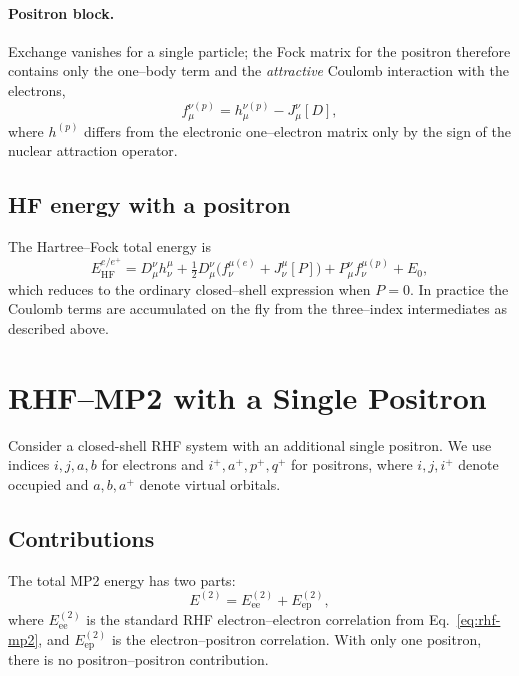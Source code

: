 \documentclass[a4paper,12pt,oneside]{book}
\newcommand{\pos}[1]{{#1}^{+}}
\begin{document}
\paragraph{Positron block.}  Exchange vanishes for a single particle;
the Fock matrix for the positron therefore contains only the one--body
term and the \emph{attractive} Coulomb interaction with the electrons,
\begin{equation}
f_{\mu}^{\nu(p)} = h_{\mu}^{\nu(p)} - J_{\mu}^{\nu}[D],
\label{eq:poshf-fock-p}
\end{equation}
where $h^{(p)}$ differs from the electronic one--electron matrix only by
the sign of the nuclear attraction operator.

\subsection{HF energy with a positron}
The Hartree--Fock total energy is
\begin{equation}
E_{\text{HF}}^{e/e^+} = D_{\mu}^{\nu} h_{\nu}^{\mu} + \tfrac12 D_{\mu}^{\nu}\bigl(f_{\nu}^{\mu(e)} + J_{\nu}^{\mu}[P]\bigr)
+        P_{\mu}^{\nu}  f_{\nu}^{\mu(p)}
+ E_0,
\end{equation}
which reduces to the ordinary closed--shell expression when
$P=0$.  In practice the Coulomb terms are accumulated on the fly
from the three--index intermediates as described above.



\section{RHF--MP2 with a Single Positron}
\label{sec:rhf_positron_mp2}

Consider a closed-shell RHF system with an additional single positron.
We use indices $i,j,a,b$ for electrons and $\pos{i},\pos{a},\pos{p},\pos{q}$ for positrons, where
$i,j,\pos{i}$ denote occupied and $a,b,\pos{a}$ denote virtual orbitals.

\subsection{Contributions}
The total MP2 energy has two parts:
\begin{equation}
E^{(2)} = E^{(2)}_{\mathrm{ee}} + E^{(2)}_{\mathrm{ep}},
\end{equation}
where $E^{(2)}_{\mathrm{ee}}$ is the standard RHF electron--electron correlation 
from Eq.~\eqref{eq:rhf-mp2}, and $E^{(2)}_{\mathrm{ep}}$ is the electron--positron 
correlation. With only one positron, there is no positron--positron contribution.
\end{document}
